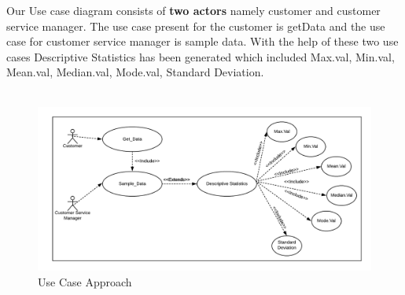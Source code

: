 \documentclass[a4paper, 11pt]{article}
\begin{document}
Our Use case diagram consists of \textbf{two actors} namely customer and customer service manager. The use case present for the customer is getData and the use case for customer service manager is sample data. With the help of these two use cases Descriptive Statistics has been generated which included Max.val, Min.val, Mean.val, Median.val, Mode.val, Standard Deviation.\\ \\ 
\begin{figure}[!hbt]
		\begin{center}
		\includegraphics[width=\columnwidth]{Blank_Diagram.png}
		\caption{Use Case Approach}
		\label{fig:figure}
		\end{center}
	\end{figure}
\end{document}
